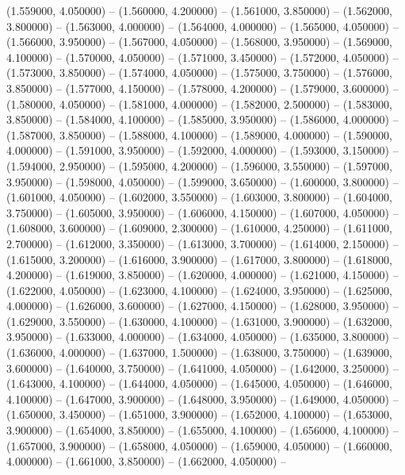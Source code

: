 (1.559000, 4.050000) -- 
(1.560000, 4.200000) -- 
(1.561000, 3.850000) -- 
(1.562000, 3.800000) -- 
(1.563000, 4.000000) -- 
(1.564000, 4.000000) -- 
(1.565000, 4.050000) -- 
(1.566000, 3.950000) -- 
(1.567000, 4.050000) -- 
(1.568000, 3.950000) -- 
(1.569000, 4.100000) -- 
(1.570000, 4.050000) -- 
(1.571000, 3.450000) -- 
(1.572000, 4.050000) -- 
(1.573000, 3.850000) -- 
(1.574000, 4.050000) -- 
(1.575000, 3.750000) -- 
(1.576000, 3.850000) -- 
(1.577000, 4.150000) -- 
(1.578000, 4.200000) -- 
(1.579000, 3.600000) -- 
(1.580000, 4.050000) -- 
(1.581000, 4.000000) -- 
(1.582000, 2.500000) -- 
(1.583000, 3.850000) -- 
(1.584000, 4.100000) -- 
(1.585000, 3.950000) -- 
(1.586000, 4.000000) -- 
(1.587000, 3.850000) -- 
(1.588000, 4.100000) -- 
(1.589000, 4.000000) -- 
(1.590000, 4.000000) -- 
(1.591000, 3.950000) -- 
(1.592000, 4.000000) -- 
(1.593000, 3.150000) -- 
(1.594000, 2.950000) -- 
(1.595000, 4.200000) -- 
(1.596000, 3.550000) -- 
(1.597000, 3.950000) -- 
(1.598000, 4.050000) -- 
(1.599000, 3.650000) -- 
(1.600000, 3.800000) -- 
(1.601000, 4.050000) -- 
(1.602000, 3.550000) -- 
(1.603000, 3.800000) -- 
(1.604000, 3.750000) -- 
(1.605000, 3.950000) -- 
(1.606000, 4.150000) -- 
(1.607000, 4.050000) -- 
(1.608000, 3.600000) -- 
(1.609000, 2.300000) -- 
(1.610000, 4.250000) -- 
(1.611000, 2.700000) -- 
(1.612000, 3.350000) -- 
(1.613000, 3.700000) -- 
(1.614000, 2.150000) -- 
(1.615000, 3.200000) -- 
(1.616000, 3.900000) -- 
(1.617000, 3.800000) -- 
(1.618000, 4.200000) -- 
(1.619000, 3.850000) -- 
(1.620000, 4.000000) -- 
(1.621000, 4.150000) -- 
(1.622000, 4.050000) -- 
(1.623000, 4.100000) -- 
(1.624000, 3.950000) -- 
(1.625000, 4.000000) -- 
(1.626000, 3.600000) -- 
(1.627000, 4.150000) -- 
(1.628000, 3.950000) -- 
(1.629000, 3.550000) -- 
(1.630000, 4.100000) -- 
(1.631000, 3.900000) -- 
(1.632000, 3.950000) -- 
(1.633000, 4.000000) -- 
(1.634000, 4.050000) -- 
(1.635000, 3.800000) -- 
(1.636000, 4.000000) -- 
(1.637000, 1.500000) -- 
(1.638000, 3.750000) -- 
(1.639000, 3.600000) -- 
(1.640000, 3.750000) -- 
(1.641000, 4.050000) -- 
(1.642000, 3.250000) -- 
(1.643000, 4.100000) -- 
(1.644000, 4.050000) -- 
(1.645000, 4.050000) -- 
(1.646000, 4.100000) -- 
(1.647000, 3.900000) -- 
(1.648000, 3.950000) -- 
(1.649000, 4.050000) -- 
(1.650000, 3.450000) -- 
(1.651000, 3.900000) -- 
(1.652000, 4.100000) -- 
(1.653000, 3.900000) -- 
(1.654000, 3.850000) -- 
(1.655000, 4.100000) -- 
(1.656000, 4.100000) -- 
(1.657000, 3.900000) -- 
(1.658000, 4.050000) -- 
(1.659000, 4.050000) -- 
(1.660000, 4.000000) -- 
(1.661000, 3.850000) -- 
(1.662000, 4.050000) -- 
